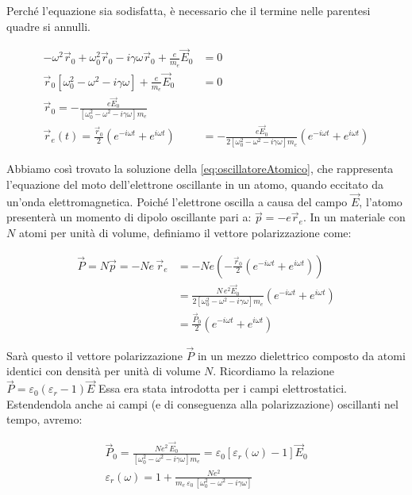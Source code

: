 Perché l'equazione sia sodisfatta, è necessario che il termine nelle parentesi quadre si annulli.

\begin{equation*}
	\begin{aligned}
		-\omega^2 \vec{r}_0 + \omega_0 ^2 \vec{r}_0 - i\gamma \omega \vec{r}_0 + \frac{e}{m_e}\vec{E}_0 &=0 \\
		\vec{r}_0[\omega_0^2 -\omega^2  - i\gamma \omega] + \frac{e}{m_e} \vec{E}_0 &=0 \\
		\vec{r}_0 = -\frac{e\vec{E}_0}{[\omega_0^2 -\omega^2  - i\gamma \omega]m_e} \\
		\vec{r}_e(t) = \frac{\vec{r}_0}{2} (e^{-i\omega t}+e^{i\omega t}  ) &= -\frac{e\vec{E}_0}{2[\omega_0^2 -\omega^2  - i\gamma \omega]m_e} (e^{-i\omega t}+e^{i\omega t}  )
	\end{aligned}
\end{equation*}

Abbiamo così trovato la soluzione della \eqref{eq:oscillatoreAtomico}, che rappresenta l'equazione del moto dell'elettrone oscillante in un atomo, quando eccitato da un'onda elettromagnetica. Poiché l'elettrone oscilla a causa del campo $\vec{E}$, l'atomo presenterà un momento di dipolo oscillante pari a: $ \vec{p} = -e \vec{r}_e  $. In un materiale con $N$ atomi per unità di volume, definiamo il vettore polarizzazione come:

\begin{equation*}
	\begin{aligned}
		\vec{P} = N\vec{p} =-Ne\,\vec{r}_e &= -N e \left( -\frac{\vec{r}_0}{2}(e^{-i\omega t}+e^{i\omega t}) \right) \\
		&= \frac{N\,e^2 \vec{E}_0}{2[\omega_0^2-\omega^2 -i\gamma \omega]m_e}(e^{-i\omega t}+e^{i\omega t}) \\
		&= \frac{\vec{P}_0}{2} (e^{-i\omega t}+e^{i\omega t})
	\end{aligned}
\end{equation*}

Sarà questo il vettore polarizzazione $\vec{P}$ in un mezzo dielettrico composto da atomi identici con densità per unità di volume $N$.
Ricordiamo la relazione $ \vec{P} = \varepsilon_0 (\varepsilon_r -1)\vec{E}  $
Essa era stata introdotta per i campi elettrostatici. Estendendola anche ai campi (e di conseguenza alla polarizzazione) oscillanti nel tempo, avremo:

\begin{gather*}
	\vec{P}_0 = \frac{Ne^2 \,\vec{E}_0}{[\omega_0^2-\omega^2 -i\gamma \omega]m_e} = \varepsilon_0 \left[ \varepsilon_r (\omega) -1 \right] \vec{E}_0 \\
	\boxed{\varepsilon_r (\omega) = 1 + \frac{Ne^2}{m_e\,\varepsilon_0\,[\omega_0^2-\omega^2 -i\gamma \omega]}}
\end{gather*}

